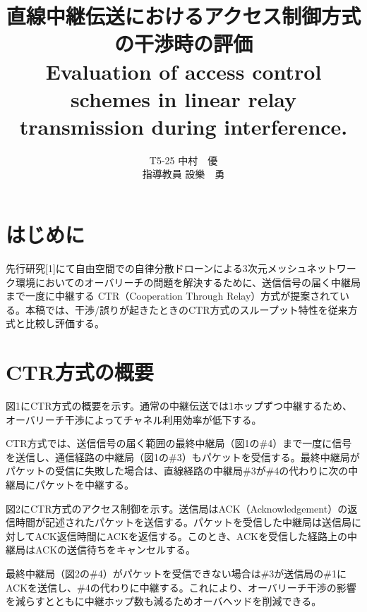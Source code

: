 \documentclass[a4paper,10pt]{ltjsarticle}
\title{\huge 直線中継伝送におけるアクセス制御方式の干渉時の評価\\
\Large Evaluation of access control schemes in linear relay transmission during interference.
}
\author{
T5-25 \:中村　優\\
指導教員 \: 設樂　勇
}
\date{}
\begin{document}
\twocolumn[
\maketitle
]

\section{はじめに}
\begin{samepage}
先行研究[1]にて自由空間での自律分散ドローンによる3次元メッシュネットワーク環境においてのオーバリーチの問題を解決するために、送信信号の届く中継局まで一度に中継する CTR（Cooperation Through Relay）方式が提案されている。本稿では、干渉/誤りが起きたときのCTR方式のスループット特性を従来方式と比較し評価する。
\end{samepage}

\section{CTR方式の概要}
\begin{samepage}
図1にCTR方式の概要を示す。通常の中継伝送では1ホップずつ中継するため、オーバリーチ干渉によってチャネル利用効率が低下する。

CTR方式では、送信信号の届く範囲の最終中継局（図1の\#4）まで一度に信号を送信し、通信経路の中継局（図1の\#3）もパケットを受信する。最終中継局がパケットの受信に失敗した場合は、直線経路の中継局\#3が\#4の代わりに次の中継局にパケットを中継する。

図2にCTR方式のアクセス制御を示す。送信局はACK（Acknowledgement）の返信時間が記述されたパケットを送信する。パケットを受信した中継局は送信局に対してACK返信時間にACKを返信する。このとき、ACKを受信した経路上の中継局はACKの送信待ちをキャンセルする。

最終中継局（図2の\#4）がパケットを受信できない場合は\#3が送信局の\#1にACKを送信し、\#4の代わりに中継する。これにより、オーバリーチ干渉の影響を減らすとともに中継ホップ数も減るためオーバヘッドを削減できる。
\end{samepage}




\end{document}
